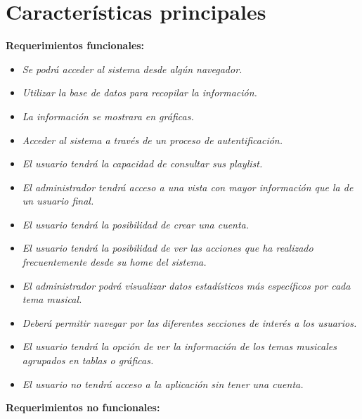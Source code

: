 \documentclass[12pt,a4paper]{book}
\begin{document}
\section{Características principales}
\vspace{0.5 cm}
\textbf {Requerimientos funcionales:}
\vspace{0.5 cm}
\begin{itemize}
\item \textit{Se podrá acceder al sistema desde algún navegador.}
\item \textit{Utilizar la base de datos para recopilar la información.}
\item \textit{La información se mostrara en gráficas.}
\item \textit{Acceder al sistema a través de un proceso de autentificación.}
\item \textit{El usuario tendrá la capacidad de consultar sus playlist.}
\item \textit{El administrador tendrá acceso a una vista con mayor información que la de un usuario final.}
\item \textit{El usuario tendrá la posibilidad de crear una cuenta.}
\item \textit{El usuario tendrá la posibilidad de ver las acciones que ha realizado frecuentemente desde su home del sistema.}
\item \textit{El administrador podrá visualizar datos estadísticos más específicos por cada tema musical.}
\item \textit{Deberá permitir navegar por las diferentes secciones de interés a los usuarios.}
\item \textit{El usuario tendrá la opción de ver la información de los temas musicales agrupados en tablas o gráficas.}
\item \textit{El usuario no tendrá acceso a la aplicación sin tener una cuenta.}
\end{itemize}
\newpage
\textbf {Requerimientos no funcionales:}
\vspace{0.5 cm}
\end{document}
